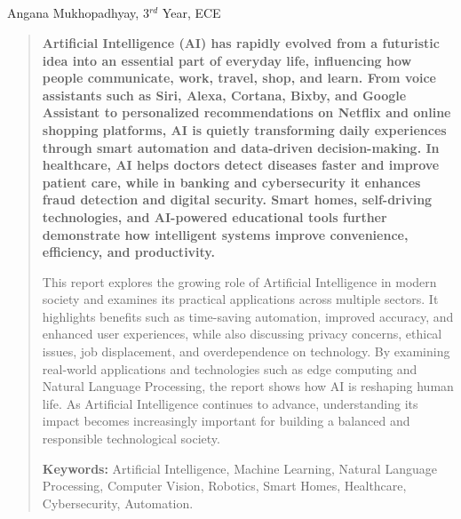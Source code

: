 \begin{center}
  \section{}
  Angana Mukhopadhyay, 3$^{rd}$ Year, ECE
\end{center}

\setcounter{figure}{0}
\setcounter{table}{0}

\begin{multicols}{2}
  \setlength{\parskip}{0pt}
  \begin{abstract}
    \bfseries
    Artificial Intelligence (AI) has rapidly evolved from a futuristic idea into an essential part of everyday life, influencing how people communicate, work, travel, shop, and learn. From voice assistants such as Siri, Alexa, Cortana, Bixby, and Google Assistant to personalized recommendations on Netflix and online shopping platforms, AI is quietly transforming daily experiences through smart automation and data-driven decision-making. In healthcare, AI helps doctors detect diseases faster and improve patient care, while in banking and cybersecurity it enhances fraud detection and digital security. Smart homes, self-driving technologies, and AI-powered educational tools further demonstrate how intelligent systems improve convenience, efficiency, and productivity.

    \noindent
    This report explores the growing role of Artificial Intelligence in modern society and examines its practical applications across multiple sectors. It highlights benefits such as time-saving automation, improved accuracy, and enhanced user experiences, while also discussing privacy concerns, ethical issues, job displacement, and overdependence on technology. By examining real-world applications and technologies such as edge computing and Natural Language Processing, the report shows how AI is reshaping human life. As Artificial Intelligence continues to advance, understanding its impact becomes increasingly important for building a balanced and responsible technological society.

    \vspace{0.18em}
    {\justifying\noindent\textbf{Keywords:} Artificial Intelligence, Machine Learning, Natural Language Processing, Computer Vision, Robotics, Smart Homes, Healthcare, Cybersecurity, Automation.\par}
  \end{abstract}

\end{multicols}
